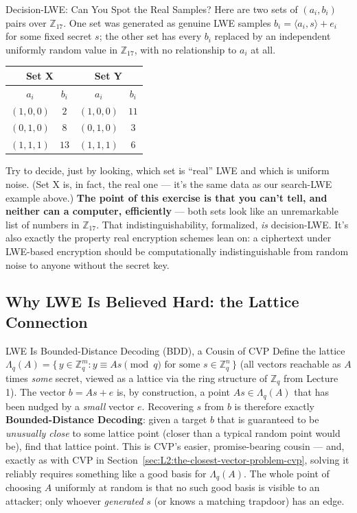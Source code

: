 \begin{exbox}{Decision-LWE: Can You Spot the Real Samples?}
Here are two sets of $(a_i, b_i)$ pairs over $\mathbb{Z}_{17}$. One set was generated as genuine LWE samples $b_i = \langle a_i, s\rangle + e_i$ for some fixed secret $s$; the other set has every $b_i$ replaced by an independent uniformly random value in $\mathbb{Z}_{17}$, with no relationship to $a_i$ at all.
\begin{center}
\begin{tabular}{|c|c|c|c|}
\hline
\multicolumn{2}{|c|}{Set X} & \multicolumn{2}{c|}{Set Y} \\
\hline
$a_i$ & $b_i$ & $a_i$ & $b_i$ \\
\hline
$(1,0,0)$ & $2$ & $(1,0,0)$ & $11$ \\
$(0,1,0)$ & $8$ & $(0,1,0)$ & $3$ \\
$(1,1,1)$ & $13$ & $(1,1,1)$ & $6$ \\
\hline
\end{tabular}
\end{center}
Try to decide, just by looking, which set is ``real'' LWE and which is uniform noise. (Set X is, in fact, the real one --- it's the same data as our search-LWE example above.) \textbf{The point of this exercise is that you can't tell, and neither can a computer, efficiently} --- both sets look like an unremarkable list of numbers in $\mathbb{Z}_{17}$. That indistinguishability, formalized, \emph{is} decision-LWE. It's also exactly the property real encryption schemes lean on: a ciphertext under LWE-based encryption should be computationally indistinguishable from random noise to anyone without the secret key.
\end{exbox}

\subsection{Why LWE Is Believed Hard: the Lattice Connection}
\label{sec:L2:why-lwe-is-believed-hard-the-lattice-con}

\begin{rmkbox}{LWE Is Bounded-Distance Decoding (BDD), a Cousin of CVP}
Define the lattice $\Lambda_q(A) = \{\, y \in \mathbb{Z}_q^m : y \equiv As \pmod q \text{ for some } s \in \mathbb{Z}_q^n \,\}$ (all vectors reachable as $A$ times \emph{some} secret, viewed as a lattice via the ring structure of $\mathbb{Z}_q$ from Lecture 1). The vector $b = As + e$ is, by construction, a point $As \in \Lambda_q(A)$ that has been nudged by a \emph{small} vector $e$. Recovering $s$ from $b$ is therefore exactly \textbf{Bounded-Distance Decoding}: given a target $b$ that is guaranteed to be \emph{unusually close} to some lattice point (closer than a typical random point would be), find that lattice point. This is CVP's easier, promise-bearing cousin --- and, exactly as with CVP in Section~\ref{sec:L2:the-closest-vector-problem-cvp}, solving it reliably requires something like a good basis for $\Lambda_q(A)$. The whole point of choosing $A$ uniformly at random is that no such good basis is visible to an attacker; only whoever \emph{generated} $s$ (or knows a matching trapdoor) has an edge.
\end{rmkbox}

